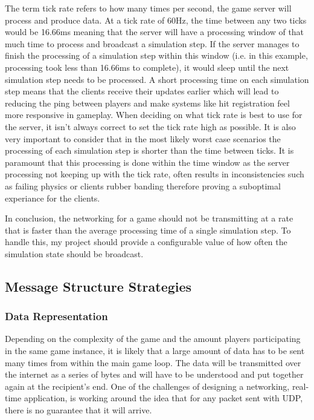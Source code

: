 The term tick rate refers to how many times per second, the game server will process and produce data. At a tick rate of 60Hz, the time between any two ticks would be 16.66ms meaning that the server will have a processing window of that much time to process and broadcast a simulation step. If the server manages to finish the processing of a simulation step within this window (i.e. in this example, processing took less than 16.66ms to complete), it would sleep until the next simulation step needs to be processed. A short processing time on each simulation step means that the clients receive their updates earlier which will lead to reducing the ping between players and make systems like hit registration feel more responsive in gameplay. When deciding on what tick rate is best to use for the server, it isn't always correct to set the tick rate high as possible. It is also very important to consider that in the most likely worst case scenarios the processing of each simulation step is shorter than the time between ticks. It is paramount that this processing is done within the time window as the server processing not keeping up with the tick rate, often results in inconsistencies such as failing physics or clients rubber banding therefore proving a suboptimal experiance for the clients.

In conclusion, the networking for a game should not be transmitting at a rate that is faster than the average processing time of a single simulation step. To handle this, my project should provide a configurable value of how often the simulation state should be broadcast.


\subsection{Message Structure Strategies}
\subsubsection{Data Representation}
Depending on the complexity of the game and the amount players participating in the same game instance, it is likely that a large amount of data has to be sent many times from within the main game loop. The data will be transmitted over the internet as a series of bytes and will have to be understood and put together again at the recipient's end. One of the challenges of designing a networking, real-time application, is working around the idea that for any packet sent with UDP, there is no guarantee that it will arrive.

